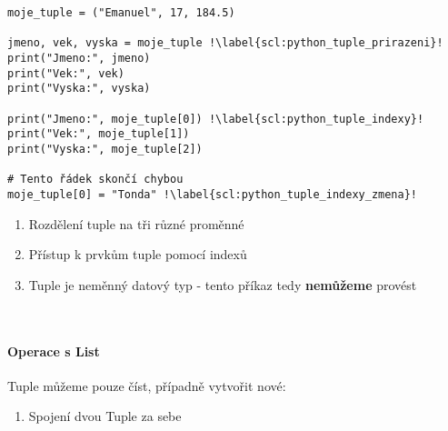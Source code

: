 \begin{minipage}[t]{.45\textwidth}
\begin{code}
\begin{verbatim}
moje_tuple = ("Emanuel", 17, 184.5)

jmeno, vek, vyska = moje_tuple !\label{scl:python_tuple_prirazeni}!
print("Jmeno:", jmeno)
print("Vek:", vek)
print("Vyska:", vyska)

print("Jmeno:", moje_tuple[0]) !\label{scl:python_tuple_indexy}!
print("Vek:", moje_tuple[1])
print("Vyska:", moje_tuple[2])

# Tento řádek skončí chybou
moje_tuple[0] = "Tonda" !\label{scl:python_tuple_indexy_zmena}!
\end{verbatim}

\label{code:typy_list_elements}
\end{code}
\end{minipage}
\begin{minipage}[t]{.45\textwidth}
\begin{enumerate}
\item[ř. \ref{scl:python_tuple_prirazeni}:] Rozdělení tuple na tři různé proměnné
\item[ř. \ref{scl:python_tuple_indexy}:] Přístup k prvkům tuple pomocí indexů
\item[ř. \ref{scl:python_tuple_indexy_zmena}:] Tuple je neměnný datový typ - tento příkaz tedy \textbf{nemůžeme} provést
\end{enumerate}
\end{minipage}\\ 

\paragraph{Operace s List}
Tuple můžeme pouze číst, případně vytvořit nové:
\begin{enumerate}
\item[+] Spojení dvou Tuple za sebe
\end{enumerate}




